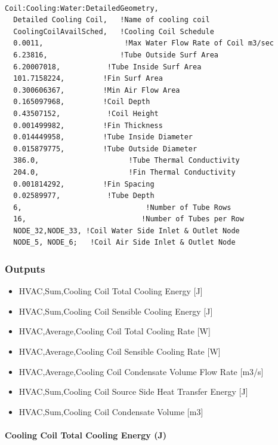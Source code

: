 \begin{lstlisting}

Coil:Cooling:Water:DetailedGeometry,
  Detailed Cooling Coil,   !Name of cooling coil
  CoolingCoilAvailSched,   !Cooling Coil Schedule
  0.0011,                   !Max Water Flow Rate of Coil m3/sec
  6.23816,                 !Tube Outside Surf Area
  6.20007018,           !Tube Inside Surf Area
  101.7158224,         !Fin Surf Area
  0.300606367,         !Min Air Flow Area
  0.165097968,         !Coil Depth
  0.43507152,           !Coil Height
  0.001499982,         !Fin Thickness
  0.014449958,         !Tube Inside Diameter
  0.015879775,         !Tube Outside Diameter
  386.0,                     !Tube Thermal Conductivity
  204.0,                     !Fin Thermal Conductivity
  0.001814292,         !Fin Spacing
  0.02589977,           !Tube Depth
  6,                             !Number of Tube Rows
  16,                           !Number of Tubes per Row
  NODE_32,NODE_33, !Coil Water Side Inlet & Outlet Node
  NODE_5, NODE_6;   !Coil Air Side Inlet & Outlet Node
\end{lstlisting}

\subsubsection{Outputs}\label{outputs-11-002}

\begin{itemize}
\item
  HVAC,Sum,Cooling Coil Total Cooling Energy {[}J{]}
\item
  HVAC,Sum,Cooling Coil Sensible Cooling Energy {[}J{]}
\item
  HVAC,Average,Cooling Coil Total Cooling Rate {[}W{]}
\item
  HVAC,Average,Cooling Coil Sensible Cooling Rate {[}W{]}
\item
  HVAC,Average,Cooling Coil Condensate Volume Flow Rate {[}m3/s{]}
\item
  HVAC,Sum,Cooling Coil Source Side Heat Transfer Energy {[}J{]}
\item
  HVAC,Sum,Cooling Coil Condensate Volume {[}m3{]}
\end{itemize}

\paragraph{Cooling Coil Total Cooling Energy (J)}\label{cooling-coil-total-cooling-energy-j-3}

